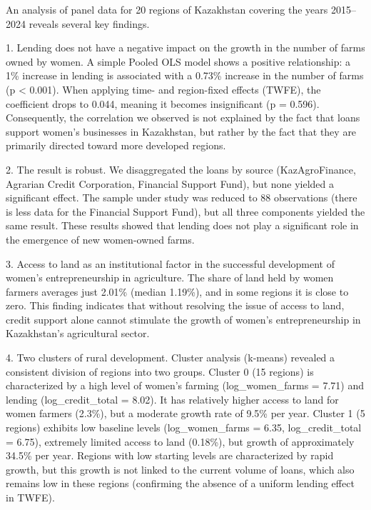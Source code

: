 \documentclass[
]{article}
\newcounter{none} %
\begin{document}
An analysis of panel data for 20 regions of Kazakhstan covering the
years 2015--2024 reveals several key findings.

1. Lending does not have a negative impact on the growth in the number
of farms owned by women. A simple Pooled OLS model shows a positive
relationship: a 1\% increase in lending is associated with a 0.73\%
increase in the number of farms (p \textless{} 0.001). When applying
time- and region-fixed effects (TWFE), the coefficient drops to 0.044,
meaning it becomes insignificant (p = 0.596). Consequently, the
correlation we observed is not explained by the fact that loans support
women's businesses in Kazakhstan, but rather by the fact that they are
primarily directed toward more developed regions.

2. The result is robust. We disaggregated the loans by source
(KazAgroFinance, Agrarian Credit Corporation, Financial Support Fund),
but none yielded a significant effect. The sample under study was
reduced to 88 observations (there is less data for the Financial Support
Fund), but all three components yielded the same result. These results
showed that lending does not play a significant role in the emergence of
new women-owned farms.

3. Access to land as an institutional factor in the successful
development of women's entrepreneurship in agriculture. The share of
land held by women farmers averages just 2.01\% (median 1.19\%), and in
some regions it is close to zero. This finding indicates that without
resolving the issue of access to land, credit support alone cannot
stimulate the growth of women's entrepreneurship in Kazakhstan's
agricultural sector.

4. Two clusters of rural development. Cluster analysis (k-means)
revealed a consistent division of regions into two groups. Cluster 0 (15
regions) is characterized by a high level of women's farming
(log\_women\_farms = 7.71) and lending (log\_credit\_total = 8.02). It
has relatively higher access to land for women farmers (2.3\%), but a
moderate growth rate of 9.5\% per year. Cluster 1 (5 regions) exhibits
low baseline levels (log\_women\_farms = 6.35, log\_credit\_total =
6.75), extremely limited access to land (0.18\%), but growth of
approximately 34.5\% per year. Regions with low starting levels are
characterized by rapid growth, but this growth is not linked to the
current volume of loans, which also remains low in these regions
(confirming the absence of a uniform lending effect in TWFE).
\end{document}
